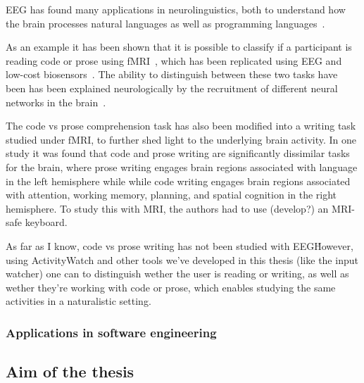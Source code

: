         EEG has found many applications in neurolinguistics, both to understand how the brain processes natural languages as well as programming languages~\cite{prat_relating_2020}.

         As an example it has been shown that it is possible to classify if a participant is reading code or prose using fMRI~\cite{floyd_decoding_2017}, which has been replicated using EEG and low-cost biosensors~\cite{fucci_replication_2019}. The ability to distinguish between these two tasks have been has been explained neurologically by the recruitment of different neural networks in the brain~\cite{ivanova_comprehension_2020}. 

        The code vs prose comprehension task has also been modified into a writing task studied under fMRI, to further shed light to the underlying brain activity. In one study it was found that code and prose writing are significantly dissimilar tasks for the brain, where prose writing engages brain regions associated with language in the left hemisphere while while code writing engages brain regions associated with attention, working memory, planning, and spatial cognition in the right hemisphere\cite{noauthor_neurological_nodate}. To study this with MRI, the authors had to use (develop?) an MRI-safe keyboard.

        As far as I know, code vs prose writing has not been studied with EEG\. However, using ActivityWatch and other tools we've developed in this thesis (like the input watcher) one can to distinguish wether the user is reading or writing, as well as wether they're working with code or prose, which enables studying the same activities in a naturalistic setting.

    \subsubsection{Applications in software engineering}




\subsection{Aim of the thesis}

